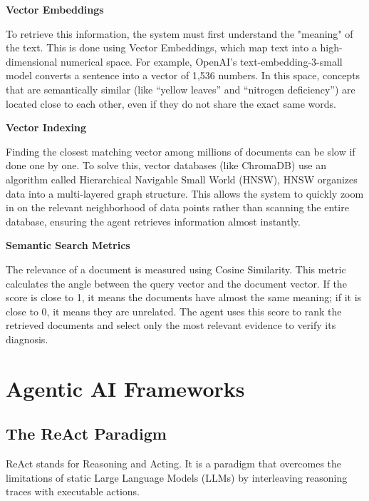 \textbf{Vector Embeddings} 

To retrieve this information, the system must first understand the "meaning" of the text. This is done using Vector Embeddings, which map text into a high-dimensional numerical space. For example, OpenAI’s text-embedding-3-small model converts a sentence into a vector of 1,536 numbers. In this space, concepts that are semantically similar (like ``yellow leaves'' and ``nitrogen deficiency'') are located close to each other, even if they do not share the exact same words.

\textbf{Vector Indexing}

Finding the closest matching vector among millions of documents can be slow if done one by one. To solve this, vector databases (like ChromaDB) use an algorithm called Hierarchical Navigable Small World (HNSW)\cite{hnsw}, HNSW organizes data into a multi-layered graph structure. This allows the system to quickly zoom in on the relevant neighborhood of data points rather than scanning the entire database, ensuring the agent retrieves information almost instantly.

\textbf{Semantic Search Metrics}

The relevance of a document is measured using Cosine Similarity. This metric calculates the angle between the query vector and the document vector. If the score is close to 1, it means the documents have almost the same meaning; if it is close to 0, it means they are unrelated. The agent uses this score to rank the retrieved documents and select only the most relevant evidence to verify its diagnosis.


\section{Agentic AI Frameworks}

\subsection{The ReAct Paradigm}
ReAct stands for Reasoning and Acting. It is a paradigm that overcomes the limitations of static Large Language Models (LLMs) by interleaving reasoning traces with executable actions.

